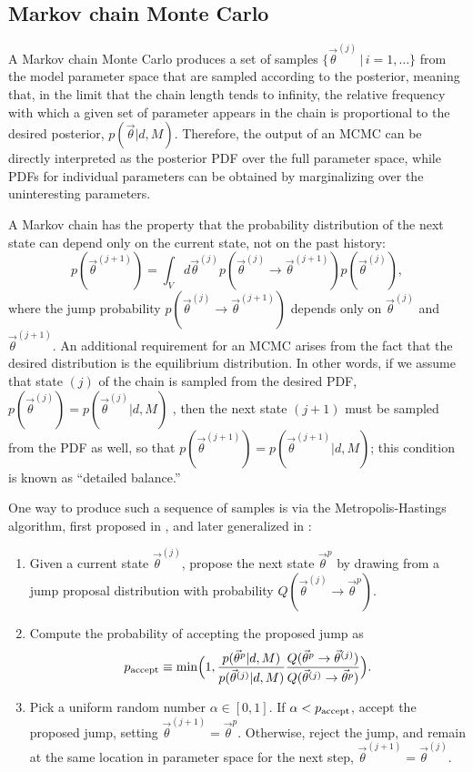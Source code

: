 \documentclass{iopart}
\newcommand{\vtheta}{\vec{\theta}}
\newcommand{\be}{\begin{equation}}
\newcommand{\ee}{\end{equation}}
\newcommand{\bel}[1]{\begin{equation}\label{#1}}
\begin{document}
\subsection{Markov chain Monte Carlo} \label{sec:mcmc}

A Markov chain Monte Carlo \cite{Gilks:1996} produces a set of samples
$\{ \vtheta^{(j)} \, | \, i = 1, \ldots \}$ from the model parameter
space that are sampled according to the posterior, meaning that, in
the limit that the chain length tends to infinity, the relative
frequency with which a given set of parameter appears in the chain is
proportional to the desired posterior, $p(\vtheta|d,M)$.  Therefore,
the output of an MCMC can be directly interpreted as the posterior PDF
over the full parameter space, while PDFs for individual parameters
can be obtained by marginalizing over the uninteresting parameters.

A Markov chain has the property that the probability distribution of
the next state can depend only on the current state, not on the past
history: 
%
\be 
p(\vtheta^{(j+1)})=\int_{V} d\vtheta^{(j)} p(\vtheta^{(j)} \to
\vtheta^{(j+1)}) p(\vtheta^{(j)}), \ee
%
where the jump probability $p(\vtheta^{(j)} \to \vtheta^{(j+1)})$
depends only on $\vtheta^{(j)}$ and $\vtheta^{(j+1)}$.  An additional
requirement for an MCMC arises from the fact that the desired
distribution is the equilibrium distribution.  In other words, if we
assume that state $(j)$ of the chain is sampled from the desired PDF,
$p(\vtheta^{(j)})=p(\vtheta^{(j)}|d,M)$ , then the next state $(j+1)$ must
be sampled from the PDF as well, so that
$p(\vtheta^{(j+1)})=p(\vtheta^{(j+1)}|d,M)$; this condition is known as
``detailed balance.''

One way to produce such a sequence of samples is via the
Metropolis-Hastings algorithm, first proposed in
\cite{Metropolis:1953}, and later generalized in
\cite{Hastings:1970}:
\begin{enumerate}
\item Given a current state $\vtheta^{(j)}$, propose the next state
  $\vtheta^p$ by drawing from a jump proposal distribution with
  probability $Q(\vtheta^{(j)} \to \vtheta^p)$.
\item Compute the probability of accepting the proposed jump as
  \bel{eq:p-accept} 
p_{\textnormal{accept}} \equiv \min\Bigl(1,
\frac{p(\vtheta^p|d, M)}{p(\vtheta^{(j)}|d, M)} \frac{Q(\vtheta^p \to
  \vtheta^{(j)})}{Q(\vtheta^{(j)} \to \vtheta^p)} \Bigr).  
\ee
\item Pick a uniform random number $\alpha \in [0,1]$.  If $\alpha<
  p_{\textnormal{accept}}$, accept the proposed jump, setting
  $\vtheta^{(j+1)}=\vtheta^p$.  Otherwise, reject the jump, and remain
  at the same location in parameter space for the next step,
  $\vtheta^{(j+1)}=\vtheta^{(j)}$.
\end{enumerate}
 
\end{document}
